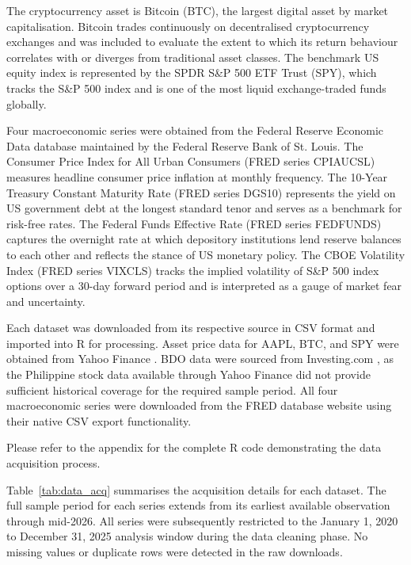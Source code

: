 The cryptocurrency asset is Bitcoin (BTC), the largest digital asset by market capitalisation. Bitcoin trades continuously on decentralised cryptocurrency exchanges and was included to evaluate the extent to which its return behaviour correlates with or diverges from traditional asset classes. The benchmark US equity index is represented by the SPDR S\&P 500 ETF Trust (SPY), which tracks the S\&P 500 index and is one of the most liquid exchange-traded funds globally.

Four macroeconomic series were obtained from the Federal Reserve Economic Data database maintained by the Federal Reserve Bank of St. Louis. The Consumer Price Index for All Urban Consumers (FRED series CPIAUCSL) measures headline consumer price inflation at monthly frequency. The 10-Year Treasury Constant Maturity Rate (FRED series DGS10) represents the yield on US government debt at the longest standard tenor and serves as a benchmark for risk-free rates. The Federal Funds Effective Rate (FRED series FEDFUNDS) captures the overnight rate at which depository institutions lend reserve balances to each other and reflects the stance of US monetary policy. The CBOE Volatility Index (FRED series VIXCLS) tracks the implied volatility of S\&P 500 index options over a 30-day forward period and is interpreted as a gauge of market fear and uncertainty.

Each dataset was downloaded from its respective source in CSV format and imported into R for processing. Asset price data for AAPL, BTC, and SPY were obtained from Yahoo Finance \parencite{yahoo_finance}. BDO data were sourced from Investing.com \parencite{investingcom}, as the Philippine stock data available through Yahoo Finance did not provide sufficient historical coverage for the required sample period. All four macroeconomic series were downloaded from the FRED database website \parencite{fred_data} using their native CSV export functionality. 

Please refer to the appendix for the complete R code demonstrating the data acquisition process.

Table~\ref{tab:data_acq} summarises the acquisition details for each dataset. The full sample period for each series extends from its earliest available observation through mid-2026. All series were subsequently restricted to the January 1, 2020 to December 31, 2025 analysis window during the data cleaning phase. No missing values or duplicate rows were detected in the raw downloads.

